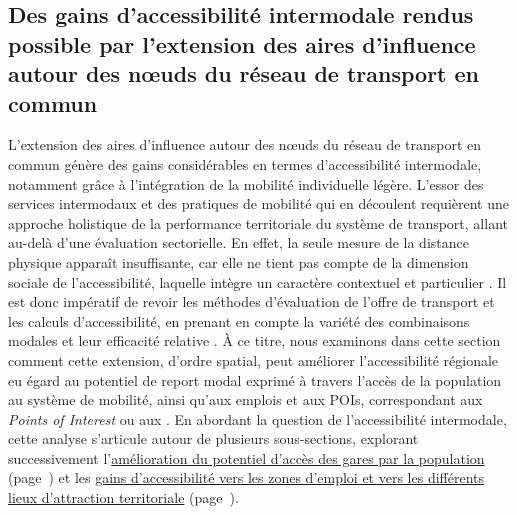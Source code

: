 \begin{refsegment}
    \newpage
\section{Des gains d'accessibilité intermodale rendus possible par l’extension des aires d’influence autour des nœuds du réseau de transport en commun
    \label{chap5:accessibilite-intermodale-extension-aire-influence}
    }

L'extension des aires d'influence autour des nœuds du réseau de transport en commun génère des gains considérables en termes d'\gls{accessibilité intermodale}, notamment grâce à l'intégration de la mobilité individuelle légère. L'essor des services intermodaux et des pratiques de mobilité qui en découlent requièrent une approche holistique de la performance territoriale du système de transport, allant au-delà d'une évaluation sectorielle. En effet, la seule mesure de la distance physique apparaît insuffisante, car elle ne tient pas compte de la dimension sociale de l'accessibilité, laquelle intègre un caractère contextuel et particulier \textcolor{blue}{\autocite[3]{lhostis_definir_2010}}. Il est donc impératif de revoir les méthodes d'évaluation de l'offre de transport et les calculs d'accessibilité, en prenant en compte la variété des combinaisons modales et leur efficacité relative \textcolor{blue}{\autocite[111]{chapelon_transports_2016}}. À ce titre, nous examinons dans cette section comment cette extension, d'ordre spatial, peut améliorer l'accessibilité régionale eu égard au potentiel de report modal exprimé à travers l'accès de la population au système de mobilité, ainsi qu'aux emplois et aux \acrfull{POIs}, correspondant aux \textsl{Points of Interest} ou aux . En abordant la question de l'accessibilité intermodale, cette analyse s'articule autour de plusieurs sous-sections, explorant successivement l'\hyperref[chap5:couverture-population]{amélioration du potentiel d'accès des gares par la population} (page~\pageref{chap5:couverture-population}) et les \hyperref[chap5:accessibilite-emplois]{gains d'accessibilité vers les zones d'emploi et vers les différents lieux d'attraction territoriale} (page~\pageref{chap5:accessibilite-emplois}).%


\end{refsegment}
